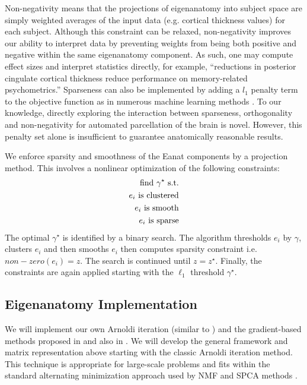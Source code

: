 \documentclass{elsarticle}\usepackage{graphicx, color}
\begin{document}
   Non-negativity means that the projections of eigenanatomy into subject space are simply weighted averages of the input data (e.g. cortical thickness values) for each subject.   Although this constraint can be relaxed, non-negativity improves our ability to interpret data by preventing weights from being both positive and negative within the same eigenanatomy component. As such, one may compute effect sizes and interpret statistics directly, for example, ``reductions in posterior cingulate cortical thickness reduce performance on memory-related psychometrics.''  Sparseness can also be implemented by adding a $l_1$ penalty term to the objective function as in numerous machine learning methods \cite{sparseNMF_hoyer,sparseNMF_kim,sparseNMF_heiler,sparsePCA_zou,sparsePCA_jordan,sparsePCA_journee,Gandy2010,Chennubhotla2001,Lee2011}.  %
To our knowledge, directly exploring the interaction between sparseness, orthogonality and non-negativity for automated parcellation of the brain is novel.  However, this penalty set alone is insufficient to guarantee anatomically reasonable results.


 We enforce sparsity and
smoothness of the Eanat components by a projection method.  This
involves a nonlinear optimization of the following constraints:
\begin{eqnarray}
\text{find $\gamma^\star$ s.t.}  \notag \\
\text{$e_i$ is clustered}  \notag \\
\text{$e_i$ is smooth}  \notag \\
\text{$e_i$ is sparse} 
\end{eqnarray}
The optimal $\gamma^\star$ is identified by a binary search. 
The algorithm thresholds $e_i$ by $\gamma$, clusters $e_i$ and then
smooths $e_i$ then computes sparsity constraint i.e. $non-zero( e_i
)=z$.   The search is continued until $z=z^\star$.  Finally, the
constraints are again  applied starting with the $\ell_1$ threshold
$\gamma^\star$.  

\subsection{Eigenanatomy Implementation} 
  We will implement our own Arnoldi iteration (similar to \cite{Gandy2010,sparsePCA_journee}) and the gradient-based methods proposed in \cite{Cai2010} and also in \cite{Lee1999}.  We will develop the general framework and matrix representation above starting with the classic Arnoldi iteration method.  This technique is appropriate for large-scale problems and fits within the standard alternating minimization approach used by NMF and SPCA methods \cite{Gandy2010}.  
\end{document}
